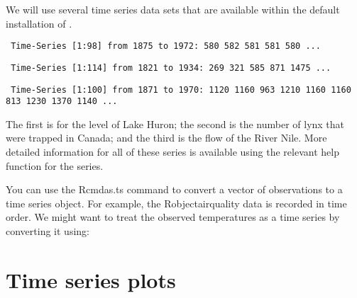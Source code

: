 We will use several time series data sets that are available within the default installation of \R{}.  
\begin{knitrout}
\color{fgcolor}\begin{kframe}
\begin{alltt}
\hlstd{> }
\end{alltt}
\begin{verbatim}
 Time-Series [1:98] from 1875 to 1972: 580 582 581 581 580 ...
\end{verbatim}
\begin{alltt}
\hlstd{> }
\end{alltt}
\begin{verbatim}
 Time-Series [1:114] from 1821 to 1934: 269 321 585 871 1475 ...
\end{verbatim}
\begin{alltt}
\hlstd{> }
\end{alltt}
\begin{verbatim}
 Time-Series [1:100] from 1871 to 1970: 1120 1160 963 1210 1160 1160 813 1230 1370 1140 ...
\end{verbatim}
\end{kframe}
\end{knitrout}
The first is for the level of Lake Huron; the second is the number of lynx that were trapped in Canada; and the third is the flow of the River Nile. More detailed information for all of these series is available using the relevant help function for the series. 
 
You can use the Rcmd{as.ts} command to convert a vector of observations to a time series object. For example, the Robject{airquality} data is recorded in time order. We might want to treat the observed temperatures as a time series by converting it using: 
\begin{knitrout}
\color{fgcolor}\begin{kframe}
\begin{alltt}
\hlstd{> } \hlkwb{=} \hlopt{$}
\end{alltt}
\end{kframe}
\end{knitrout}
 
\section{Time series plots} 
 
